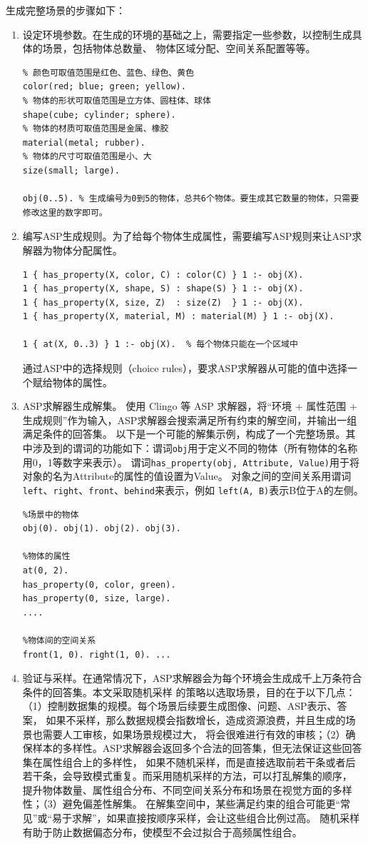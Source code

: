 生成完整场景的步骤如下：
\begin{enumerate}[nosep]
\item 设定环境参数。在生成的环境的基础之上，需要指定一些参数，以控制生成具体的场景，包括物体总数量、
物体区域分配、空间关系配置等等。
\begin{lstlisting}
% 颜色可取值范围是红色、蓝色、绿色、黄色
color(red; blue; green; yellow).
% 物体的形状可取值范围是立方体、圆柱体、球体
shape(cube; cylinder; sphere).
% 物体的材质可取值范围是金属、橡胶
material(metal; rubber).
% 物体的尺寸可取值范围是小、大
size(small; large).

obj(0..5). % 生成编号为0到5的物体，总共6个物体。要生成其它数量的物体，只需要修改这里的数字即可。
\end{lstlisting}
\item 编写ASP生成规则。为了给每个物体生成属性，需要编写ASP规则来让ASP求解器为物体分配属性。
\begin{lstlisting}
1 { has_property(X, color, C) : color(C) } 1 :- obj(X).
1 { has_property(X, shape, S) : shape(S) } 1 :- obj(X).
1 { has_property(X, size, Z)  : size(Z)  } 1 :- obj(X).
1 { has_property(X, material, M) : material(M) } 1 :- obj(X).

1 { at(X, 0..3) } 1 :- obj(X).  % 每个物体只能在一个区域中
\end{lstlisting}
通过ASP中的选择规则（choice rules），要求ASP求解器从可能的值中选择一个赋给物体的属性。
\item ASP求解器生成解集。
使用 Clingo 等 ASP 求解器，将“环境 + 属性范围 + 生成规则”作为输入，ASP求解器会搜索满足所有约束的解空间，并输出一组满足条件的回答集。
以下是一个可能的解集示例，构成了一个完整场景。其中涉及到的谓词的功能如下：谓词\texttt{obj}用于定义不同的物体（所有物体的名称用0，1等数字来表示）。
谓词\texttt{has\_property(obj, Attribute, Value)}用于将对象的名为Attribute的属性的值设置为Value。
对象之间的空间关系用谓词\texttt{left}、\texttt{right}、\texttt{front}、\texttt{behind}来表示，例如
\texttt{left(A, B)}表示B位于A的左侧。
\begin{lstlisting}
%场景中的物体
obj(0). obj(1). obj(2). obj(3).

%物体的属性
at(0, 2).
has_property(0, color, green).
has_property(0, size, large).
....

%物体间的空间关系
front(1, 0). right(1, 0). ...
\end{lstlisting}
\item 验证与采样。在通常情况下，ASP求解器会为每个环境会生成成千上万条符合条件的回答集。本文采取随机采样
的策略以选取场景，目的在于以下几点：（1）控制数据集的规模。每个场景后续要生成图像、问题、ASP表示、答案，
如果不采样，那么数据规模会指数增长，造成资源浪费，并且生成的场景也需要人工审核，如果场景规模过大，
将会很难进行有效的审核；（2）确保样本的多样性。ASP求解器会返回多个合法的回答集，但无法保证这些回答集在属性组合上的多样性，
如果不随机采样，而是直接选取前若干条或者后若干条，会导致模式重复。而采用随机采样的方法，可以打乱解集的顺序，
提升物体数量、属性组合分布、不同空间关系分布和场景在视觉方面的多样性；（3）避免偏差性解集。
在解集空间中，某些满足约束的组合可能更“常见”或“易于求解”，如果直接按顺序采样，会让这些组合比例过高。
随机采样有助于防止数据偏态分布，使模型不会过拟合于高频属性组合。


\end{enumerate}
